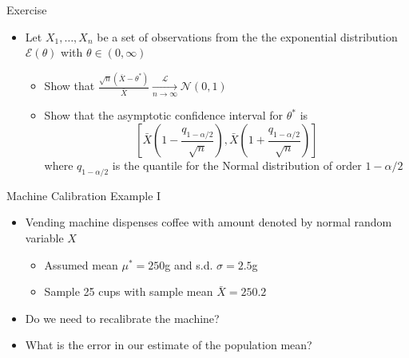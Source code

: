 \documentclass{beamer}
\begin{document}
\begin{frame}{Exercise}  
\begin{itemize} 
 \item Let $X_1, \ldots, X_n$ be a set of observations from the the exponential distribution $\mathcal{E}(\theta)$ with $\theta \in (0, \infty)$ 
 \begin{itemize}
 \item Show that $\frac{\sqrt{n}(\bar{X} - \theta^*) }{\bar{X}} \xrightarrow[n \rightarrow \infty]{\mathcal{L}} \mathcal{N}(0, 1)$ 
 \item Show  that the asymptotic confidence interval for $\theta^*$ is 
 \begin{displaymath} 
  \left[\bar{X}\left(1 - \frac{q_{1-\alpha/2}}{\sqrt{n}}\right), \bar{X}\left(1 + \frac{q_{1-\alpha/2}}{\sqrt{n}}\right)  \right] 
 \end{displaymath}
  where $q_{1-\alpha/2}$ is the quantile for the Normal distribution of order $1-\alpha/2$ 
 \end{itemize} 
\end{itemize}
\end{frame}


\begin{frame}{Machine Calibration Example I}  
\begin{itemize} 
 \item Vending machine dispenses coffee with amount denoted by normal random variable $X$  
 \begin{itemize} 
  \item Assumed mean $\mu^* = 250$g and s.d. $\sigma = 2.5$g
  \item Sample 25 cups with sample mean $\bar{X} = 250.2$
 \end{itemize}
 \item Do we need to recalibrate the machine? 
 \item What is the error in our estimate of the population mean? 
\end{itemize}
\end{frame}
\end{document}
